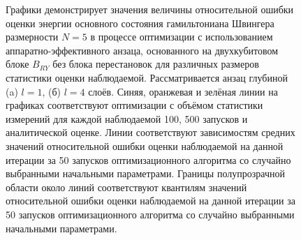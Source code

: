 \documentclass[14pt]{extarticle}
\begin{document}
\begin{figure}[H]
\begin{minipage}[H]{1.\linewidth}
\end{minipage}
\vfill
\begin{minipage}[H]{1.\linewidth}
\end{minipage}
\caption{Графики демонстрирует значения величины относительной ошибки оценки энергии основного состояния гамильтониана Швингера размерности $N = 5$ в процессе оптимизации с использованием аппаратно-эффективного анзаца, основанного на двухкубитовом блоке $B_{RY}$ без блока перестановок для различных размеров статистики оценки наблюдаемой. Рассматривается анзац глубиной (a) $l = 1$, (б) $l = 4$ слоёв. Синяя, оранжевая и зелёная линии на графиках соответствуют оптимизации с объёмом статистики измерений для каждой наблюдаемой 100, 500 запусков и аналитической оценке. Линии соответствуют зависимостям средних значений относительной ошибки оценки наблюдаемой на данной итерации за 50 запусков оптимизационного алгоритма со случайно выбранными начальными параметрами. Границы полупрозрачной области около линий соответствуют квантилям значений относительной ошибки оценки наблюдаемой на данной итерации за 50 запусков оптимизационного алгоритма со случайно выбранными начальными параметрами.}\label{fig:shots_comp}
\end{figure}
\end{document}
